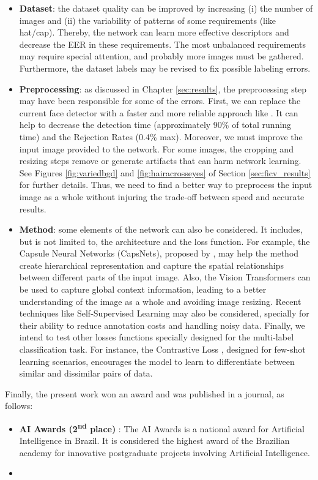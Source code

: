 \begin{itemize}
\item \textbf{Dataset}: the dataset quality can be improved by increasing (i) the number of images and (ii) the variability of patterns of some requirements (like hat/cap). Thereby, the network can learn more effective descriptors and decrease the EER in these requirements. The most unbalanced requirements may require special attention, and probably more images must be gathered. Furthermore, the dataset labels may be revised to fix possible labeling errors.

\item \textbf{Preprocessing}: as discussed in Chapter \ref{sec:results}, the preprocessing step may have been responsible for some of the errors. First, we can replace the current face detector with a faster and more reliable approach like \cite{faceboxes}. It can help to decrease the detection time (approximately 90\% of total running time) and the Rejection Rates (0.4\% max). Moreover, we must improve the input image provided to the network. For some images, the cropping and resizing steps remove or generate artifacts that can harm network learning. See Figures \ref{fig:variedbgd} and \ref{fig:hairacrosseyes} of Section \ref{sec:ficv_results} for further details. Thus, we need to find a better way to preprocess the input image as a whole without injuring the trade-off between speed and accurate results.

\item \textbf{Method}: some elements of the network can also be considered. It includes, but is not limited to, the architecture and the loss function. For example, the Capsule Neural Networks (CapsNets), proposed by \cite{sabour2017dynamic}, may help the method create hierarchical representation and capture the spatial relationships between different parts of the input image. Also, the Vision Transformers \citep{dosovitskiy2020image} can be used to capture global context information, leading to a better understanding of the image as a whole and avoiding image resizing. Recent techniques like Self-Supervised Learning \citep{doersch2017multi} may also be considered, specially for their ability to reduce annotation costs and handling noisy data. Finally, we intend to test other losses functions specially designed for the multi-label classification task. For instance, the Contrastive Loss \citep{khosla2020supervised}, designed for few-shot learning scenarios, encourages the model to learn to differentiate between similar and dissimilar pairs of data.
\end{itemize}

Finally, the present work won an award and was published in a journal, as follows:

\begin{itemize}
\item \textbf{AI Awards (2\textsuperscript{nd} place)} \citep{aiaward}: The AI Awards is a national award for Artificial Intelligence in Brazil. It is considered the highest award of the Brazilian academy for innovative postgraduate projects involving Artificial Intelligence.

\item {}
\end{itemize}